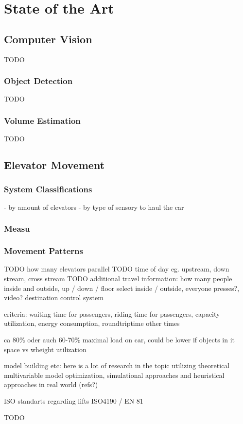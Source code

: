 \chapter{State of the Art}
\label{chap:sota}

\section{Computer Vision}

TODO

\subsection{Object Detection}

TODO

\subsection{Volume Estimation}

TODO

\section{Elevator Movement}

\subsection{System Classifications}
- by amount of elevators
- by type of sensory to haul the car

\subsection{Measu}

\subsection{Movement Patterns}

TODO how many elevators parallel
TODO time of day eg. upstream, down stream, cross stream
TODO additional travel information: how many people inside and outside, up / down / floor select inside / outside, everyone presses?, video? 
destination control system

criteria: waiting time for passengers, riding time for passengers, capacity utilization, energy consumption, roundtriptime other times

ca 80\% oder auch 60-70\% maximal load on car, could be lower if objects in it
space vs wheight utilization

model building etc: here is a lot of research in the topic utilizing theoretical multivariable model optimization, simulational approaches and heuristical approaches in real world (refs?)

ISO standarts regarding lifts ISO4190 / EN 81

TODO
